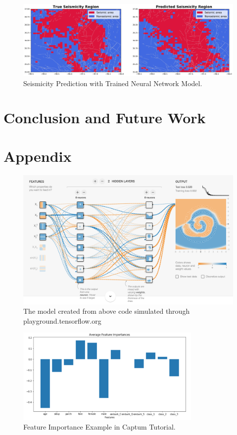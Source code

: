 \documentclass[final-report]{report-template}
\begin{document}
\begin{figure}
    \begin{center}
        \includegraphics[width=1\textwidth]{neural_network_result.png}
    \end{center}
    \caption{\label{fig:neural_network_result} Seismicity Prediction with Trained Neural Network Model.}
\end{figure}
\section{Conclusion and Future Work}





\newpage

\section{Appendix}
\begin{figure}
    \begin{center}
        \includegraphics[width=1\textwidth]{neural_network_exmaple.png}
    \end{center}
    \caption{\label{fig:neural_network_example} The model created from above code simulated through playground.tensorflow.org}
\end{figure}

\begin{figure}
    \begin{center}
        \includegraphics[width=0.8\textwidth]{feature_importance.png}
    \end{center}
    \caption{\label{fig:feature_importance} Feature Importance Example in Captum Tutorial.}
\end{figure}
\end{document}
